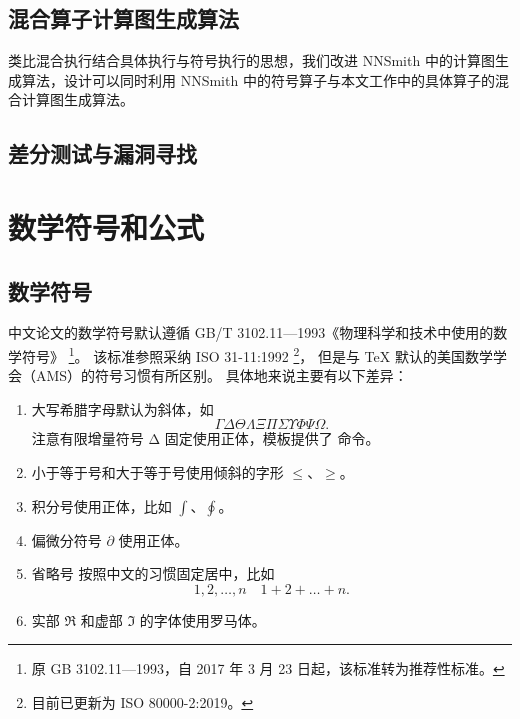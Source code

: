 \section{混合算子计算图生成算法}

类比混合执行结合具体执行与符号执行的思想，我们改进 NNSmith 中的计算图生成算法，设计可以同时利用 NNSmith 中的符号算子与本文工作中的具体算子的混合计算图生成算法。



\section{差分测试与漏洞寻找}


\iffalse
\chapter{数学符号和公式}

\section{数学符号}

中文论文的数学符号默认遵循 GB/T 3102.11—1993《物理科学和技术中使用的数学符号》
\footnote{原 GB 3102.11—1993，自 2017 年 3 月 23 日起，该标准转为推荐性标准。}。
该标准参照采纳 ISO 31-11:1992 \footnote{目前已更新为 ISO 80000-2:2019。}，
但是与 \TeX{} 默认的美国数学学会（AMS）的符号习惯有所区别。
具体地来说主要有以下差异：
\begin{enumerate}
  \item 大写希腊字母默认为斜体，如
    \begin{equation*}
      \Gamma \Delta \Theta \Lambda \Xi \Pi \Sigma \Upsilon \Phi \Psi \Omega.
    \end{equation*}
    注意有限增量符号 $\increment$ 固定使用正体，模板提供了  命令。
  \item 小于等于号和大于等于号使用倾斜的字形 $\le$、$\ge$。
  \item 积分号使用正体，比如 $\int$、$\oint$。
  \item
    偏微分符号 $\partial$ 使用正体。
  \item
    省略号  按照中文的习惯固定居中，比如
    \begin{equation*}
      1, 2, \dots, n \quad 1 + 2 + \dots + n.
    \end{equation*}
  \item
    实部 $\Re$ 和虚部 $\Im$ 的字体使用罗马体。
\end{enumerate}

